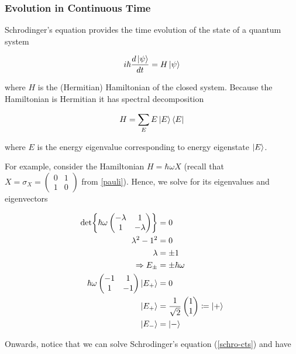 \documentclass[11pt]{article}
\newcommand\0{\mathbf{0}}
\newcommand\<{\langle}
\renewcommand\>{\rangle}
\renewcommand\implies{\Rightarrow}
\begin{document}
\subsubsection{Evolution in Continuous Time}\label{post-cts-evol}

Schrodinger's equation provides the time evolution of the state of a quantum system

\begin{align}\label{schro-cts}
i\hbar \frac{d\ket{\psi}}{dt} = H\ket{\psi}	
\end{align}

where $H$ is the (Hermitian) Hamiltonian of the closed system. Because the Hamiltonian is Hermitian it has spectral decomposition 

\begin{align*}
H = \sum_{E} E \ket{E}\bra{E}	
\end{align*}

where $E$ is the energy eigenvalue corresponding to energy eigenstate $\ket{E}$. 

For example, consider the Hamiltonian $H = \hbar \omega X$  (recall that $X = \sigma_X = \begin{pmatrix} 0 & 1 \\ 1 & 0\end{pmatrix}$ from \ref{pauli}). Hence, we solve for its eigenvalues and eigenvectors

\begin{align*}
	\det{ \hbar\omega\begin{pmatrix} -\lambda & 1 \\ 1 & -\lambda\end{pmatrix}} &= 0 \\
	\lambda^2 - 1^2 &= 0 \\
	\lambda &= \pm 1 \\
	\implies E_{\pm} &= \pm \hbar \omega \\
	\hbar\omega\begin{pmatrix} -1 & 1 \\ 1 & -1\end{pmatrix}\ket{E_+} &= 0 \\
	\ket{E_+} &= \frac{1}{\sqrt{2}}\begin{pmatrix}
		1 \\ 1
	\end{pmatrix} \coloneqq \ket{+} \\
	\ket{E_-} &= \ket{-}
\end{align*}

Onwards, notice that we can solve Schrodinger's equation (\ref{schro-cts}) and have
\end{document}
